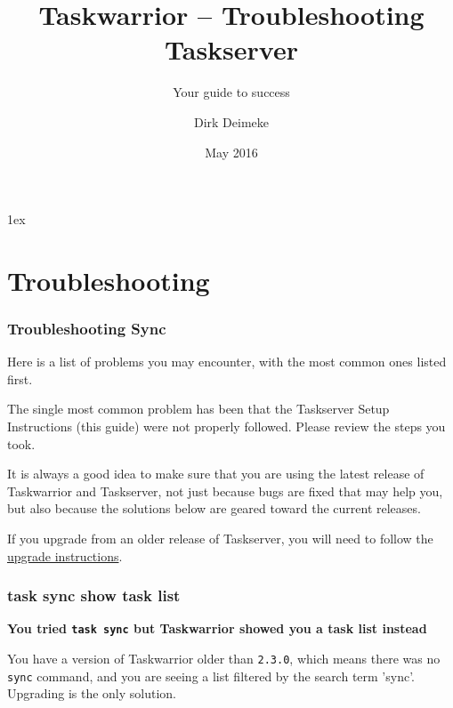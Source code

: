 \documentclass[t,handout]{beamer}
\title{Taskwarrior -- Troubleshooting Taskserver}
\subtitle{Your guide to success}
\author[Deimeke, Dirk]{Dirk Deimeke}
\institute[Taskwarrior Academy]{Taskwarrior Academy}
\date{May 2016}
\begin{document}
\begin{frame} %
	\titlepage
\end{frame}



\parskip1ex

\section{Troubleshooting}

\begin{frame}[fragile]\frametitle{Troubleshooting Sync}
  Here is a list of problems you may encounter, with the most common
  ones listed first.

  The single most common problem has been that the Taskserver Setup Instructions (this guide) were not properly followed.  Please review the steps you took.

  It is always a good idea to make sure that you are using the latest release of Taskwarrior and Taskserver, not just because bugs are fixed that may help you, but also because the solutions below are geared toward the current releases.

  If you upgrade from an older release of Taskserver, you will need to follow the \href{http://taskwarrior.org/docs/taskserver/upgrade.html}{upgrade instructions}.
\end{frame}

\begin{frame}[fragile]\frametitle{task sync show task list}
    \textbf{You tried \texttt{task sync} but Taskwarrior showed you a task list instead}

    You have a version of Taskwarrior older than \verb+2.3.0+, which means there was no \verb+sync+ command, and you are seeing a list filtered by the search term 'sync'. Upgrading is the only solution.
\end{frame}
\end{document}
